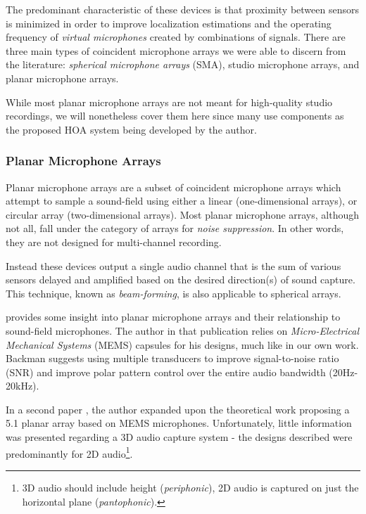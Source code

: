 The predominant characteristic of these devices is that proximity between sensors is minimized in order to improve localization estimations and the operating frequency of \textit{virtual microphones} created by combinations of signals. There are three main types of coincident microphone arrays we were able to discern from the literature: \textit{spherical microphone arrays} (SMA), studio microphone arrays, and planar microphone arrays. 

While most planar microphone arrays are not meant for high-quality studio recordings, we will nonetheless cover them here since many use components as the proposed HOA system being developed by the author. 

\subsubsection{Planar Microphone Arrays}

Planar microphone arrays are a subset of coincident microphone arrays which attempt to sample a sound-field using either a linear (one-dimensional arrays), or circular array (two-dimensional arrays). Most planar microphone arrays, although not all, fall under the category of arrays for \textit{noise suppression}. In other words, they are not designed for multi-channel recording. 

Instead these devices output a single audio channel that is the sum of various sensors delayed and amplified based on the desired direction(s) of sound capture. This technique, known as \textit{beam-forming}, is also applicable to spherical arrays.

\cite{backman2006miniature} provides some insight into planar microphone arrays and their relationship to sound-field microphones. The author in that publication relies on \textit{Micro-Electrical Mechanical Systems} (MEMS) capsules for his designs, much like in our own work. Backman suggests using multiple transducers to improve signal-to-noise ratio (SNR) and improve polar pattern control over the entire audio bandwidth (20Hz-20kHz). 

In a second paper \cite{backman2006gradient}, the author expanded upon the theoretical work proposing a 5.1 planar array based on MEMS microphones. Unfortunately, little information was presented regarding a 3D audio capture system - the designs described were predominantly for 2D audio\footnote{3D audio should include height (\textit{periphonic}), 2D audio is captured on just the horizontal plane (\textit{pantophonic}).}. 

